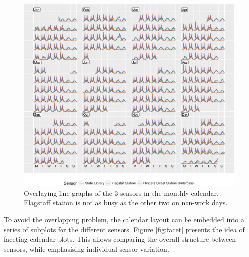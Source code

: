 \documentclass[article]{jss}
\theoremstyle{definition}
\theoremstyle{definition}
\theoremstyle{remark}
\begin{document}
\begin{CodeChunk}
\begin{figure}

{\centering \includegraphics[width=\textwidth]{figure/overlay-1} 

}

\caption[Overlaying line graphs of the 3 sensors in the monthly
calendar. Flagstaff station is not as busy as the other two on non-work
days.]{Overlaying line graphs of the 3 sensors in the monthly
calendar. Flagstaff station is not as busy as the other two on non-work
days.}\label{fig:overlay}
\end{figure}
\end{CodeChunk}





To avoid the overlapping problem, the calendar layout can be embedded
into a series of subplots for the different sensors. Figure
\ref{fig:facet} presents the idea of faceting calendar plots. This
allows comparing the overall structure between sensors, while
emphasising individual sensor variation.
\end{document}
